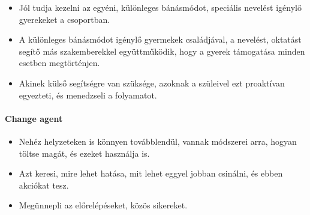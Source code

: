 \begin{itemize}

    \item
          Jól tudja kezelni az egyéni, különleges bánásmódot, speciális nevelést igénylő gyerekeket a csoportban.
    \item A különleges bánásmódot igénylő gyermekek családjával, a nevelést, oktatást segítő más szakemberekkel együttműködik, hogy a gyerek támogatása minden esetben megtörténjen.
    \item
          Akinek külső segítségre van szüksége, azoknak a szüleivel ezt proaktívan egyezteti, és menedzseli a folyamatot.
\end{itemize}

\paragraph{Change agent}\label{change-agent}

\begin{itemize}

    \item
          Nehéz helyzeteken is könnyen továbblendül, vannak módszerei arra, hogyan töltse magát, és ezeket használja is.
    \item
          Azt keresi, mire lehet hatása, mit lehet eggyel jobban csinálni, és ebben akciókat tesz.
    \item
          Megünnepli az előrelépéseket, közös sikereket.
\end{itemize}


